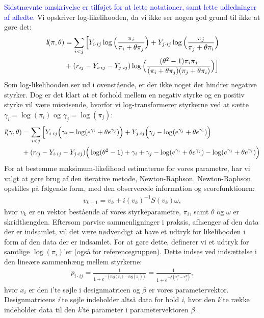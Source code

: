 \documentclass[11pt,a4paper]{article}
\begin{document}
\textcolor{blue}{Sidstnævnte omskrivelse er tilføjet for at lette notationer, samt lette udledninger af afledte.}
Vi opskriver log-likelihooden, da vi ikke ser nogen god grund til ikke at gøre det: 
\begin{align*}
\textit{l}(\pi,\theta)
&=\sum_{i<j}\Big{[}Y_{i\cdot ij}\log\Big{(}\frac{\pi_i}{\pi_i+\theta\pi_j}\Big{)}
+ Y_{j\cdot ij}\log\Big{(}\frac{\pi_j}{\pi_j+\theta\pi_i}\Big{)}\\
&+ (r_{ij}-Y_{i\cdot ij}-Y_{j\cdot ij}) \log\Big{(}\frac{(\theta^2-1)\pi_i \pi_j}{(\pi_i+\theta\pi_j)(\pi_j+\theta\pi_i)}\Big{)}\Big{]}
\end{align*}
Som log-likelihooden ser ud i ovenstående, er der ikke noget der hindrer negative styrker. Dog er det klart at et forhold mellem en negativ styrke og en positiv styrke vil være misvisende, hvorfor vi log-transformerer styrkerne ved at sætte $\gamma_i=\log(\pi_i)$ og $\gamma_j=\log(\pi_j)$:\\
\begin{align*}
\textit{l}(\gamma,\theta)
&=\sum_{i<j}\Big{[}Y_{i\cdot ij}\Big{(}\gamma_i-\log(e^{\gamma_i}+\theta e^{\gamma_j})\Big{)}
+Y_{j\cdot ij}\Big{(}\gamma_j-\log(e^{\gamma_j}+\theta e^{\gamma_i})\Big{)}\\
& +(r_{ij}-Y_{i\cdot ij}-Y_{j\cdot ij}) \Big{(} \log(\theta^2-1)+\gamma_i+\gamma_j-\log(e^{\gamma_i}+\theta e^{\gamma_j})-\log(e^{\gamma_j}+\theta e^{\gamma_i})\Big{)}
\end{align*}
For at bestemme maksimum-likelihood estimaterne for vores parametre, har vi valgt at gøre brug af den iterative metode, Newton-Raphson. Newton-Raphson opstilles på følgende form, med den observerede information og scorefunktionen:
\begin{align*}
v_{k+1} = v_{k} + \textit{i}(v_{k})^{-1}\textit{S}(v_{k})\omega,
\end{align*}
hvor $v_{k}$ er en vektor bestående af vores styrkeparametre, $\pi_i$, samt $\theta$ og $\omega$ er skridtlængden. Eftersom parvise sammenligninger i praksis, afhænger af den data der er indsamlet, vil det være nødvendigt at have et udtryk for likelihooden i form af den data der er indsamlet. For at gøre dette, definerer vi et udtryk for samtlige $\log( \pi_i)$'er (også for referencegruppen). Dette indses ved indsættelse i den lineære sammenhæng mellem styrkerne:
\begin{align*}
    p_{i\cdot ij} = \frac{1}{1+ e^{-(log(\pi_i)-log(\pi_j))}} = \frac{1}{1+ e^{-\beta(x_i^T-x_j^T)}},
\end{align*}
hvor $x_i$ er den i'te søjle i designmatricen og $\beta$ er vores parametervektor. Designmatricens \textit{i}'te søjle indeholder altså data for hold \textit{i}, hvor den \textit{k}'te række indeholder data til den \textit{k}'te parameter i parametervektoren $\beta$. \\
\end{document}
